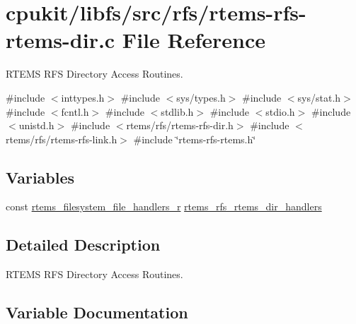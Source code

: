 \hypertarget{rtems-rfs-rtems-dir_8c}{}\section{cpukit/libfs/src/rfs/rtems-\/rfs-\/rtems-\/dir.c File Reference}
\label{rtems-rfs-rtems-dir_8c}


R\+T\+E\+MS R\+FS Directory Access Routines.  


{\ttfamily \#include $<$inttypes.\+h$>$}\newline
{\ttfamily \#include $<$sys/types.\+h$>$}\newline
{\ttfamily \#include $<$sys/stat.\+h$>$}\newline
{\ttfamily \#include $<$fcntl.\+h$>$}\newline
{\ttfamily \#include $<$stdlib.\+h$>$}\newline
{\ttfamily \#include $<$stdio.\+h$>$}\newline
{\ttfamily \#include $<$unistd.\+h$>$}\newline
{\ttfamily \#include $<$rtems/rfs/rtems-\/rfs-\/dir.\+h$>$}\newline
{\ttfamily \#include $<$rtems/rfs/rtems-\/rfs-\/link.\+h$>$}\newline
{\ttfamily \#include \char`\"{}rtems-\/rfs-\/rtems.\+h\char`\"{}}\newline
\subsection*{Variables}
\begin{DoxyCompactItemize}
\item 
const \mbox{\hyperlink{struct__rtems__filesystem__file__handlers__r}{rtems\+\_\+filesystem\+\_\+file\+\_\+handlers\+\_\+r}} \mbox{\hyperlink{rtems-rfs-rtems-dir_8c_add62aab33d39c83e13c93bac9f74a6d2}{rtems\+\_\+rfs\+\_\+rtems\+\_\+dir\+\_\+handlers}}
\end{DoxyCompactItemize}


\subsection{Detailed Description}
R\+T\+E\+MS R\+FS Directory Access Routines. 



\subsection{Variable Documentation}
\mbox{\label{rtems-rfs-rtems-dir_8c_add62aab33d39c83e13c93bac9f74a6d2}} 
